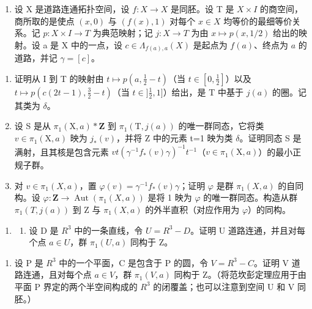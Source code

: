 \begin{enumerate}
\def\labelenumi{\arabic{enumi})}
\setcounter{enumi}{10}
\tightlist
\item
  设 X 是道路连通拓扑空间，设 \(f: X \to X\) 是同胚。设 T 是 \(X \times I\) 的商空间，商所取的是使点 \((x,0)\) 与 \((f(x),1)\) 对每个 \(x \in X\) 均等价的最细等价关系。记 \(p: X \times I \to T\) 为典范映射；记 \(j\colon X\to T\) 为由 \(x\mapsto p(x,1/2)\) 给出的映射。设 a 是 X 中的一点，设 \(c\in\Lambda_{f(a),a}(X)\) 是起点为 \(f(a)\)、终点为 \(a\) 的道路，并记 \(\gamma=[c]\)。
\end{enumerate}

\begin{enumerate}
\def\labelenumi{\alph{enumi})}
\item
  证明从 I 到 T 的映射由 \(t \mapsto p(a, \frac{1}{2} - t)\)（当 \(t \in [0, \frac{1}{2}]\)）以及 \(t \mapsto p(c(2t - 1), \frac{3}{2} - t)\)（当 \(t \in ]\frac{1}{2}, 1]\)）给出，是 T 中基于 \(j(a)\) 的圈。记其类为 \(\delta\)。
\item
 设 S 是从 \(\pi_{1}(\mathrm{X},a)*\mathbf{Z}\) 到 \(\pi_{1}(\mathrm{T},j(a))\) 的唯一群同态，它将类 \(v\in\pi_{1}(\mathrm{X},a)\) 映为 \(j_{*}(v)\)，并将 Z 中的元素 t=1 映为类 \(\delta\)。证明同态 S 是满射，且其核是包含元素 \(vt(\gamma^{-1}f_{*}(v)\gamma)^{-1}t^{-1}\)（\(v\in\pi_{1}(\mathrm{X},a)\)）的最小正规子群。
\item
  对 \(v \in \pi_{1}(X, a)\)，置 \(\varphi(v) = \gamma^{-1} f_{*}(v) \gamma\)；证明 \(\varphi\) 是群 \(\pi_{1}(X, a)\) 的自同构。设 \(\varphi: \mathbf{Z} \to \operatorname{Aut}(\pi_{1}(X, a))\) 是将 1 映为 \(\varphi\) 的唯一群同态。构造从群 \(\pi_{1}(T, j(a))\) 到 Z 与 \(\pi_{1}(X, a)\) 的外半直积（对应作用为 \(\varphi\)）的同构。
\end{enumerate}

\begin{enumerate}
\def\labelenumi{\arabic{enumi})}
\setcounter{enumi}{11}
\tightlist
\item
  \begin{enumerate}
  \def\labelenumii{\alph{enumii})}
  \tightlist
  \item
  设 D 是 \(R^{3}\) 中的一条直线，令 \(U = R^{3} - D\)。证明 U 道路连通，并且对每个点 \(a \in U\)，群 \(\pi_{1}(U, a)\) 同构于 Z。
  \end{enumerate}
\end{enumerate}

\begin{enumerate}
\def\labelenumi{\alph{enumi})}
\setcounter{enumi}{1}
\tightlist
\item
  设 P 是 \(R^{3}\) 中的一个平面，C 是包含于 P 的圆，令 \(V = R^{3} - C\)。证明 V 道路连通，且对每个点 \(a \in V\)，群 \(\pi_{1}(V, a)\) 同构于 Z。（将范坎彭定理应用于由平面 P 界定的两个半空间构成的 \(R^{3}\) 的闭覆盖；也可以注意到空间 U 和 V 同胚。）
\end{enumerate}


